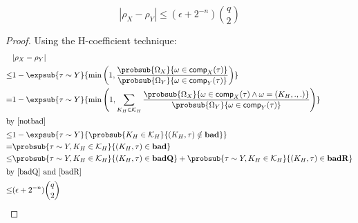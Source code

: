 \documentclass[eprint.tex]{subfiles}
\begin{document}
\begin{lemma} \label{xyadv}
    \begin{displaymath}
        |\rho_X - \rho_Y|
        \leq (\epsilon + 2^{-n})\binom{q}{2}
    \end{displaymath}
\end{lemma}

\begin{proof} Using the H-coefficient technique:
    \begin{align*}
        &|\rho_X - \rho_Y| \\
        \leq& 1 - \expsub{\tau \sim Y}{\min
            \left(1,
               \frac{\probsub{\Omega_X}{\omega \in \comp_X(\tau)}}
               {\probsub{\Omega_Y}{\omega \in \comp_Y(\tau)}}
            \right)} \\
        =& 1 - \expsub{\tau \sim Y}{\min
            \left(1, \sum_{K_H \in \mathcal{K}_H}
              \frac{\probsub{\Omega_X}{\omega \in \comp_X(\tau) \wedge \omega = (K_H, ., .)}}
              {\probsub{\Omega_Y}{\omega \in \comp_Y(\tau)}}
            \right)} \\
        \intertext{by \autoref{notbad}}
        \leq& 1 - \expsub{\tau \sim Y}{
            \probsub{K_H \in \mathcal{K}_H}{(K_H, \tau) \notin \bad}} \\
        = & \probsub{\tau \sim Y, K_H \in \mathcal{K}_H}{(K_H, \tau) \in \bad} \\
        \leq & \probsub{\tau \sim Y, K_H \in \mathcal{K}_H}{(K_H, \tau) \in \badQ}
         + \probsub{\tau \sim Y, K_H \in \mathcal{K}_H}{(K_H, \tau) \in \badR} \\
         \intertext{by \autoref{badQ} and \autoref{badR}}
        \leq & (\epsilon + 2^{-n})\binom{q}{2} \qedhere \\
    \end{align*}
\end{proof}
\end{document}
